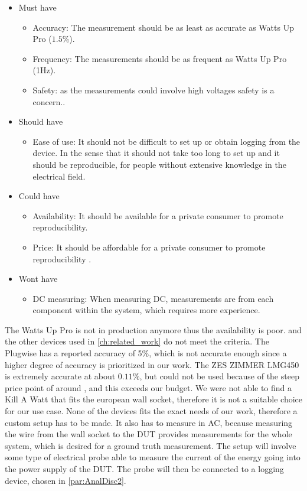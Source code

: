 \begin{itemize}
    \item Must have
    \begin{itemize}
        \item Accuracy: The measurement should be as least as accurate as Watts Up Pro ($1.5\%$)\cite{fahad2019comparative}.
        \item Frequency: The measurements should be as frequent as Watts Up Pro (1Hz)\cite{fahad2019comparative}.
        \item Safety: as the measurements could involve high voltages safety is a concern.\cite{sik}.
    \end{itemize}
    \item Should have
    \begin{itemize}
        \item Ease of use: It should not be difficult to set up or obtain logging from the device. In the sense that it should not take too long to set up and it should be reproducible, for people without extensive knowledge in the electrical field.
    \end{itemize}
    \item Could have
    \begin{itemize}
        \item Availability: It should be available for a private consumer to promote reproducibility.
        \item Price: It should be affordable for a private consumer to promote reproducibility .
    \end{itemize}
    \item Wont have
    \begin{itemize}
        \item DC measuring: When measuring DC, measurements are from each component within the system, which requires more experience.
    \end{itemize}
\end{itemize}
The Watts Up Pro is not in production anymore thus the availability is poor. and the other devices used in \cref{ch:related_work} do not meet the criteria. The Plugwise has a reported accuracy of 5\%\cite{PlugWise}, which is not accurate enough since a higher degree of accuracy is prioritized in our work. The ZES ZIMMER LMG450 is extremely accurate at about $0.11\%$\cite{hackenberg2013}, but could not be used because of the steep price point of around , and this exceeds our budget. We were not able to find a Kill A Watt\cite{KillAWatt} that fits the european wall socket, therefore it is not a suitable choice for our use case. None of the devices fits the exact needs of our work, therefore a custom setup has to be made. It also has to measure in AC, because measuring the wire from the wall socket to the DUT provides measurements for the whole system, which is desired for a ground truth measurement. The setup will involve some type of electrical probe able to measure the current of the energy going into the power supply of the DUT. The probe will then be connected to a logging device, chosen in \cref{par:AnalDisc2}. 

